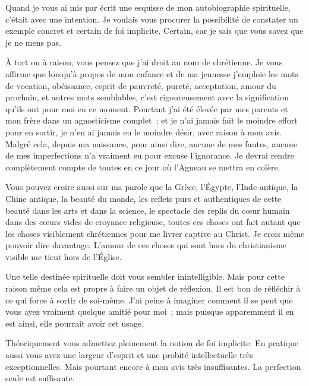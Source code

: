 \documentclass[french,twoside]{book} %
\begin{document}
Quand je vous ai mis par écrit une esquisse de mon autobiographie spirituelle, c'était avec une intention. Je voulais vous procurer la possibilité de constater un exemple concret et certain de foi implicite. Certain, car je sais que vous savez que je ne mens pas.\par
À tort ou à raison, vous pensez que j'ai droit au nom de chrétienne. Je vous affirme que lorsqu'à propos de mon enfance et de ma jeunesse j'emploie les mots de vocation, obéissance, esprit de pauvreté, pureté, acceptation, amour du prochain, et autres mots semblables, c'est rigoureusement avec la signification qu'ils ont pour moi en ce moment. Pourtant j'ai été élevée par mes parents et mon frère dans un agnosticisme complet ; et je n'ai jamais fait le moindre effort pour en sortir, je n'en ai jamais eu le moindre désir, avec raison à mon avis. Malgré cela, depuis ma naissance, pour ainsi dire, aucune de mes fautes, aucune de mes imperfections n'a vraiment eu pour excuse l'ignorance. Je devrai rendre complètement compte de toutes en ce jour où l'Agneau se mettra en colère.\par
Vous pouvez croire aussi sur ma parole que la Grèce, l'Égypte, l'Inde antique, la Chine antique, la beauté du monde, les reflets purs et authentiques de cette beauté dans les arts et dans la science, le spectacle des replis du cœur humain dans des cœurs vides de croyance religieuse, toutes ces choses ont fait autant que les choses visiblement chrétiennes pour me livrer captive au Christ. Je crois même pouvoir dire davantage. L'amour de ces choses qui sont hors du christianisme visible me tient hors de l'Église.\par
Une telle destinée spirituelle doit vous sembler inintelligible. Mais pour cette raison même cela est propre à faire un objet de réflexion. Il est bon de réfléchir à ce qui force à sortir de soi-même. J'ai peine à imaginer comment il se peut que vous ayez vraiment quelque amitié pour moi ; mais puisque apparemment il en est ainsi, elle pourrait avoir cet usage.\par
Théoriquement vous admettez pleinement la notion de foi implicite. En pratique aussi vous avez une largeur d'esprit et une probité intellectuelle très exceptionnelles. Mais pourtant encore à mon avis très insuffisantes. La perfection seule est suffisante.\par
\end{document}
